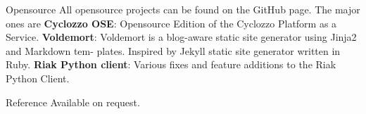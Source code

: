 \documentclass{resume}
\begin{document}
\newpage


\begin{category}{Opensource}
\citemnobullet All opensource projects can be found on the GitHub page. The major ones are
\citembullet \textbf{Cyclozzo OSE}: Opensource Edition of the Cyclozzo Platform as a Service.
\citembullet \textbf{Voldemort}: Voldemort is a blog-aware static site generator using Jinja2 
and Markdown tem- plates. Inspired by Jekyll static site generator written in Ruby.
\citembullet \textbf{Riak Python client}: Various fixes and feature additions to the Riak Python Client.
\end{category}


\begin{category}{Reference} 
\citemnobullet Available on request.
\end{category}
\end{document}
